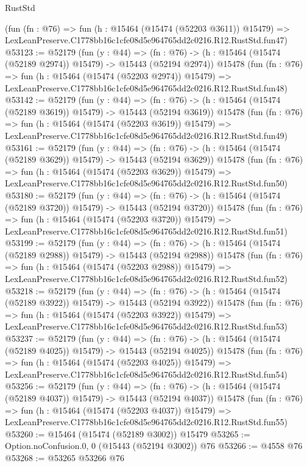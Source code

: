 \begin{lexlean}{RustStd}
\begin{coremodule}
    (fun (fn : @76) =>
    fun (h : @15464 (@15474 (@52203 @3611)) @15479) =>
    LexLeanPreserve.C1778bb16c1cfe08d5e964765dd2c0216.R12.RustStd.fun47)
@53123 := @52179
    (fun (y : @44) =>
    (fn : @76) -> (h : @15464 (@15474 (@52189 @2974)) @15479) -> @15443 (@52194 @2974))
    @15478
    (fun (fn : @76) =>
    fun (h : @15464 (@15474 (@52203 @2974)) @15479) =>
    LexLeanPreserve.C1778bb16c1cfe08d5e964765dd2c0216.R12.RustStd.fun48)
@53142 := @52179
    (fun (y : @44) =>
    (fn : @76) -> (h : @15464 (@15474 (@52189 @3619)) @15479) -> @15443 (@52194 @3619))
    @15478
    (fun (fn : @76) =>
    fun (h : @15464 (@15474 (@52203 @3619)) @15479) =>
    LexLeanPreserve.C1778bb16c1cfe08d5e964765dd2c0216.R12.RustStd.fun49)
@53161 := @52179
    (fun (y : @44) =>
    (fn : @76) -> (h : @15464 (@15474 (@52189 @3629)) @15479) -> @15443 (@52194 @3629))
    @15478
    (fun (fn : @76) =>
    fun (h : @15464 (@15474 (@52203 @3629)) @15479) =>
    LexLeanPreserve.C1778bb16c1cfe08d5e964765dd2c0216.R12.RustStd.fun50)
@53180 := @52179
    (fun (y : @44) =>
    (fn : @76) -> (h : @15464 (@15474 (@52189 @3720)) @15479) -> @15443 (@52194 @3720))
    @15478
    (fun (fn : @76) =>
    fun (h : @15464 (@15474 (@52203 @3720)) @15479) =>
    LexLeanPreserve.C1778bb16c1cfe08d5e964765dd2c0216.R12.RustStd.fun51)
@53199 := @52179
    (fun (y : @44) =>
    (fn : @76) -> (h : @15464 (@15474 (@52189 @2988)) @15479) -> @15443 (@52194 @2988))
    @15478
    (fun (fn : @76) =>
    fun (h : @15464 (@15474 (@52203 @2988)) @15479) =>
    LexLeanPreserve.C1778bb16c1cfe08d5e964765dd2c0216.R12.RustStd.fun52)
@53218 := @52179
    (fun (y : @44) =>
    (fn : @76) -> (h : @15464 (@15474 (@52189 @3922)) @15479) -> @15443 (@52194 @3922))
    @15478
    (fun (fn : @76) =>
    fun (h : @15464 (@15474 (@52203 @3922)) @15479) =>
    LexLeanPreserve.C1778bb16c1cfe08d5e964765dd2c0216.R12.RustStd.fun53)
@53237 := @52179
    (fun (y : @44) =>
    (fn : @76) -> (h : @15464 (@15474 (@52189 @4025)) @15479) -> @15443 (@52194 @4025))
    @15478
    (fun (fn : @76) =>
    fun (h : @15464 (@15474 (@52203 @4025)) @15479) =>
    LexLeanPreserve.C1778bb16c1cfe08d5e964765dd2c0216.R12.RustStd.fun54)
@53256 := @52179
    (fun (y : @44) =>
    (fn : @76) -> (h : @15464 (@15474 (@52189 @4037)) @15479) -> @15443 (@52194 @4037))
    @15478
    (fun (fn : @76) =>
    fun (h : @15464 (@15474 (@52203 @4037)) @15479) =>
    LexLeanPreserve.C1778bb16c1cfe08d5e964765dd2c0216.R12.RustStd.fun55)
@53260 := @15464 (@15474 (@52189 @3002)) @15479
@53265 := Option.noConfusion.{0, 0} (@15443 (@52194 @3002)) @76
@53266 := @4558 @76
@53268 := @53265 @53266 @76

\end{coremodule}
\end{lexlean}
